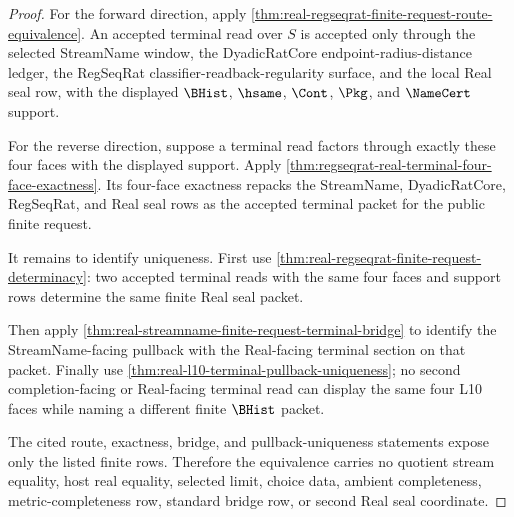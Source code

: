 \begin{proof}
For the forward direction, apply \autoref{thm:real-regseqrat-finite-request-route-equivalence}. An accepted terminal read over $S$ is accepted only through the selected StreamName window, the DyadicRatCore endpoint-radius-distance ledger, the RegSeqRat classifier-readback-regularity surface, and the local Real seal row, with the displayed $\BHist$, $\hsame$, $\Cont$, $\Pkg$, and $\NameCert$ support.

For the reverse direction, suppose a terminal read factors through exactly these four faces with the displayed support. Apply \autoref{thm:regseqrat-real-terminal-four-face-exactness}. Its four-face exactness repacks the StreamName, DyadicRatCore, RegSeqRat, and Real seal rows as the accepted terminal packet for the public finite request.

It remains to identify uniqueness. First use \autoref{thm:real-regseqrat-finite-request-determinacy}: two accepted terminal reads with the same four faces and support rows determine the same finite Real seal packet.

Then apply \autoref{thm:real-streamname-finite-request-terminal-bridge} to identify the StreamName-facing pullback with the Real-facing terminal section on that packet. Finally use \autoref{thm:real-l10-terminal-pullback-uniqueness}; no second completion-facing or Real-facing terminal read can display the same four L10 faces while naming a different finite $\BHist$ packet.

The cited route, exactness, bridge, and pullback-uniqueness statements expose only the listed finite rows. Therefore the equivalence carries no quotient stream equality, host real equality, selected limit, choice data, ambient completeness, metric-completeness row, standard bridge row, or second Real seal coordinate.
\end{proof}

